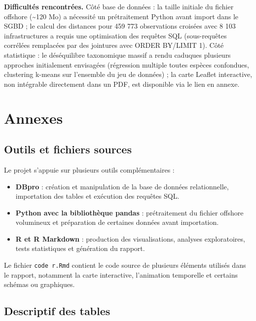 \documentclass[mstat,12pt]{unswthesis}
\begin{document}
\bigskip

\textbf{Difficultés rencontrées.} Côté base de données : la taille
initiale du fichier offshore (\textasciitilde120 Mo) a nécessité un
prétraitement Python avant import dans le SGBD ; le calcul des distances
pour 459 773 observations croisées avec 8 103 infrastructures a requis
une optimisation des requêtes SQL (sous-requêtes corrélées remplacées
par des jointures avec ORDER BY/LIMIT 1). Côté statistique : le
déséquilibre taxonomique massif a rendu caduques plusieurs approches
initialement envisagées (régression multiple toutes espèces confondues,
clustering k-means sur l'ensemble du jeu de données) ; la carte Leaflet
interactive, non intégrable directement dans un PDF, est disponible via
le lien en annexe.

\clearpage

\chapter{Annexes}\label{annexes}

\section{Outils et fichiers sources}\label{annexe-outils-sources}

Le projet s'appuie sur plusieurs outils complémentaires :

\begin{itemize}
\tightlist
\item
  \textbf{DBpro} : création et manipulation de la base de données
  relationnelle, importation des tables et exécution des requêtes SQL.
\item
  \textbf{Python avec la bibliothèque pandas} : prétraitement du fichier
  offshore volumineux et préparation de certaines données avant
  importation.
\item
  \textbf{R et R Markdown} : production des visualisations, analyses
  exploratoires, tests statistiques et génération du rapport.
\end{itemize}

Le fichier \texttt{code\ r.Rmd} contient le code source de plusieurs
éléments utilisés dans le rapport, notamment la carte interactive,
l'animation temporelle et certains schémas ou graphiques.

\section{Descriptif des tables}\label{annexe-descriptif-tables}
\end{document}
